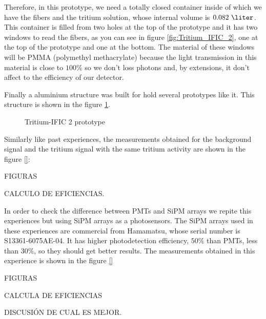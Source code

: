 Therefore, in this prototype, we need a totally closed container inside of which we have the fibers and the tritium solution, whose internal volume is $0.082~\liter$. This container is filled from two holes at the top of the prototype and it has two windows to read the fibers, as you can see in figure \ref{fig:Tritium_IFIC_2}, one at the top of the prototype and one at the bottom. The material of these windows will be PMMA (polymethyl methacrylate) because the light transmission in this material is close to $100\%$ so we don't loss photons and, by extensions, it don't affect to the efficiency of our detector.

Finally a aluminium structure was built for hold several prototypes like it. This structure is shown in the figure \ref{fig:Tritium_IFIC_2_holder}.

\begin{figure}[htbp]
\centering
{}
\caption{Tritium-IFIC 2 prototype} \label{fig:Tritium_IFIC_2_holder}
\end{figure}

Similarly like past experiences, the measurements obtained for the background signal and the tritium signal with the same tritium activity are shown in the figure \ref{}:

FIGURAS

CALCULO DE EFICIENCIAS.

In order to check the difference between PMTs and SiPM arrays we repite this experiences but using SiPM arrays as a photosensors. The SiPM arrays used in these experiences are commercial from Hamamatsu, whose serial number is S13361-6075AE-04. It has higher photodetection efficiency, $50\%$ than PMTs, less than $30\%$, so they should get better results. The measurements obtained in this experience is shown in the figure \ref{}

FIGURAS

CALCULA DE EFICIENCIAS

DISCUSIÓN DE CUAL ES MEJOR.
